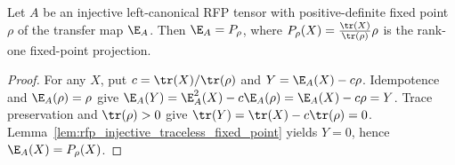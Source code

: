 \begin{lemma}%
    \label{thm:transferMap_eq_fixedPointProj_of_isTransferIdempotent_injective}
    \leanok
    Let $A$ be an injective left-canonical RFP tensor with positive-definite
    fixed point $\rho$ of the transfer map $\E_A$. Then
    $\E_A = P_\rho$, where $P_\rho(X) = \frac{\tr(X)}{\tr(\rho)} \rho$
    is the rank-one fixed-point projection.
\end{lemma}
\begin{proof}\leanok
    For any $X$, put $c=\tr(X)/\tr(\rho)$ and $Y=\E_A(X)-c\rho$.
    Idempotence and $\E_A(\rho)=\rho$ give
    $\E_A(Y)=\E_A^2(X)-c\E_A(\rho)=\E_A(X)-c\rho=Y$.
    Trace preservation and $\tr(\rho)>0$ give
    $\tr(Y)=\tr(X)-c\tr(\rho)=0$.
    Lemma~\ref{lem:rfp_injective_traceless_fixed_point} yields
    $Y=0$, hence $\E_A(X)=P_\rho(X)$.
\end{proof}

